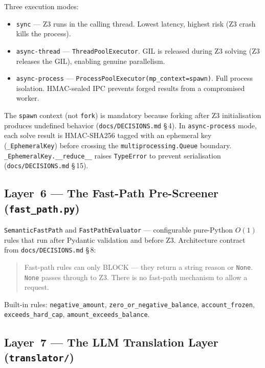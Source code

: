 \documentclass[12pt,a4paper,oneside]{report}
\newcommand{\fname}[1]{\texttt{#1}}          %
\newcommand{\code}[1]{\texttt{#1}}           %
\newcommand{\cfrsec}[1]{\S\,#1}             %
\begin{document}
Three execution modes:

\begin{itemize}
  \item \code{sync} --- Z3 runs in the calling thread. Lowest latency, highest
        risk (Z3 crash kills the process).
  \item \code{async-thread} --- \code{ThreadPoolExecutor}. GIL is released
        during Z3 solving (Z3 releases the GIL), enabling genuine parallelism.
  \item \code{async-process} --- \code{ProcessPoolExecutor(mp\_context=spawn)}.
        Full process isolation. HMAC-sealed IPC prevents forged results from a
        compromised worker.
\end{itemize}

The \code{spawn} context (not \code{fork}) is mandatory because forking after
Z3 initialisation produces undefined behavior (\fname{docs/DECISIONS.md}
\cfrsec{4}). In \code{async-process} mode, each solve result is HMAC-SHA256
tagged with an ephemeral key (\code{\_EphemeralKey}) before crossing the
\code{multiprocessing.Queue} boundary. \code{\_EphemeralKey.\_\_reduce\_\_}
raises \code{TypeError} to prevent serialisation (\fname{docs/DECISIONS.md}
\cfrsec{15}).

\subsection{Layer~6 --- The Fast-Path Pre-Screener (\fname{fast\_path.py})}

\code{SemanticFastPath} and \code{FastPathEvaluator} --- configurable
pure-Python $O(1)$ rules that run after Pydantic validation and before Z3.
Architecture contract from \fname{docs/DECISIONS.md} \cfrsec{8}:

\begin{quote}
Fast-path rules can only BLOCK --- they return a string reason or \code{None}.
\code{None} passes through to Z3. There is no fast-path mechanism to allow a
request.
\end{quote}

Built-in rules: \code{negative\_amount}, \code{zero\_or\_negative\_balance},
\code{account\_frozen}, \code{exceeds\_hard\_cap},
\code{amount\_exceeds\_balance}.

\subsection{Layer~7 --- The LLM Translation Layer (\fname{translator/})}
\end{document}
